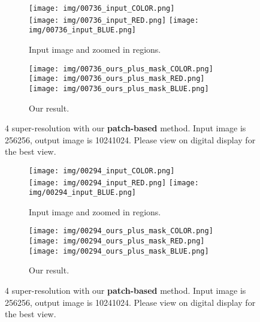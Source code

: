 \documentclass[10pt,twocolumn,letterpaper]{article}
\begin{document}
\begin{figure*}[th]
\begin{center}
    \begin{subfigure}[b]{0.4 \textwidth}
        \texttt{[image: img/00736\_input\_COLOR.png]}
        \\
        \texttt{[image: img/00736\_input\_RED.png]}
        \texttt{[image: img/00736\_input\_BLUE.png]}
        \caption{Input image  and zoomed in regions.}
    \end{subfigure}
    \begin{subfigure}[b]{0.4 \textwidth}
        \texttt{[image: img/00736\_ours\_plus\_mask\_COLOR.png]}
        \\
        \texttt{[image: img/00736\_ours\_plus\_mask\_RED.png]}
        \texttt{[image: img/00736\_ours\_plus\_mask\_BLUE.png]}
        \caption{Our result.}
    \end{subfigure}
\end{center}
\caption{4 super-resolution with our \textbf{patch-based} method. Input image is 256256, output image is 10241024. Please view on digital display for the best view.}
\label{fig:appendix}
\end{figure*}

\begin{figure*}[th]
\begin{center}
    \begin{subfigure}[b]{0.4 \textwidth}
        \texttt{[image: img/00294\_input\_COLOR.png]}
        \\
        \texttt{[image: img/00294\_input\_RED.png]}
        \texttt{[image: img/00294\_input\_BLUE.png]}
        \caption{Input image  and zoomed in regions.}
    \end{subfigure}
    \begin{subfigure}[b]{0.4 \textwidth}
        \texttt{[image: img/00294\_ours\_plus\_mask\_COLOR.png]}
        \\
        \texttt{[image: img/00294\_ours\_plus\_mask\_RED.png]}
        \texttt{[image: img/00294\_ours\_plus\_mask\_BLUE.png]}
        \caption{Our result.}
    \end{subfigure}
\end{center}
\caption{4 super-resolution with our \textbf{patch-based} method. Input image is 256256, output image is 10241024. Please view on digital display for the best view.}
\label{fig:appendix}
\end{figure*}
\end{document}

